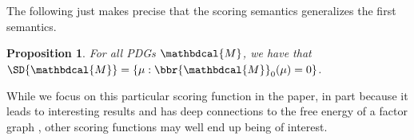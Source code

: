 \documentclass{article}
\theoremstyle{plain}
\newtheorem{prop}[theorem]{Proposition}
\theoremstyle{definition}
\theoremstyle{remark}
\newcommand{\dg}[1]{\mathbdcal{#1}}
\newcommand\Inc{\mathit{Inc}}
\numberwithin{equation}{section}
\begin{document}
        The following just makes precise that the scoring semantics
        generalizes the first semantics.
	\begin{prop}\label{prop:sd-is-zeroset}
For all PDGs $\dg M$, we have that $\SD{\dg M} = \{ \mu : \bbr{\dg
          M}_0(\mu) = 0\}$. 
\end{prop}
          
While we focus on this particular scoring function
in the paper, 
in part because
it leads to interesting results and has deep
connections to the free energy of a factor graph \cite{KF09},
other scoring functions may well end up being of interest. 
        
	
\end{document}
